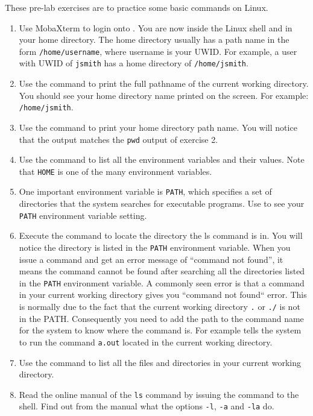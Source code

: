 These pre-lab exercises are to practice some basic commands on Linux. 
\begin{enumerate}
    \item Use MobaXterm to login onto
      . You are now inside the Linux shell and in your home directory. The home directory usually has a path name in the form \verb+/home/username+, where username is your UWID. For example, a user with UWID of \verb+jsmith+ has a home directory of \verb+/home/jsmith+.
    \item Use the  command to print the full pathname of the current working directory. You should see your home directory name printed on the screen. For example: \verb+/home/jsmith+.
    \item Use the  command to print your home directory path name. You will notice that the output matches the \verb+pwd+ output of exercise 2.
    \item Use the  command to list all the environment variables and their values. Note that \verb+HOME+ is one of the many environment variables.
    \item One important environment variable is \verb+PATH+, which specifies a set of directories that the system searches for executable programs. Use  to see your \verb+PATH+ environment variable setting.
    \item Execute the command  to locate the directory the ls command is in. You will notice the directory is listed in the \verb+PATH+ environment variable. When you issue a command and get an error message of ``command not found'', it means the command cannot be found after searching all the directories listed in the \verb+PATH+ environment variable. A commonly seen error is that a command in your current working directory gives you ``command not found`` error. This is normally due to the fact that the current working directory \verb+.+ or \verb+./+ is not in the PATH. Consequently you need to add the path to the command name for the system to know where the command is. For example  tells the system to run the command \verb+a.out+ located in the current working directory. 
    \item Use the  command to list all the files and directories in your current working directory. 
    \item Read the online manual of the \verb+ls+ command by issuing the
       command to the shell.
      Find out from the manual what the options \verb+-l+, \verb+-a+ and \verb+-la+ do.

\end{enumerate}
